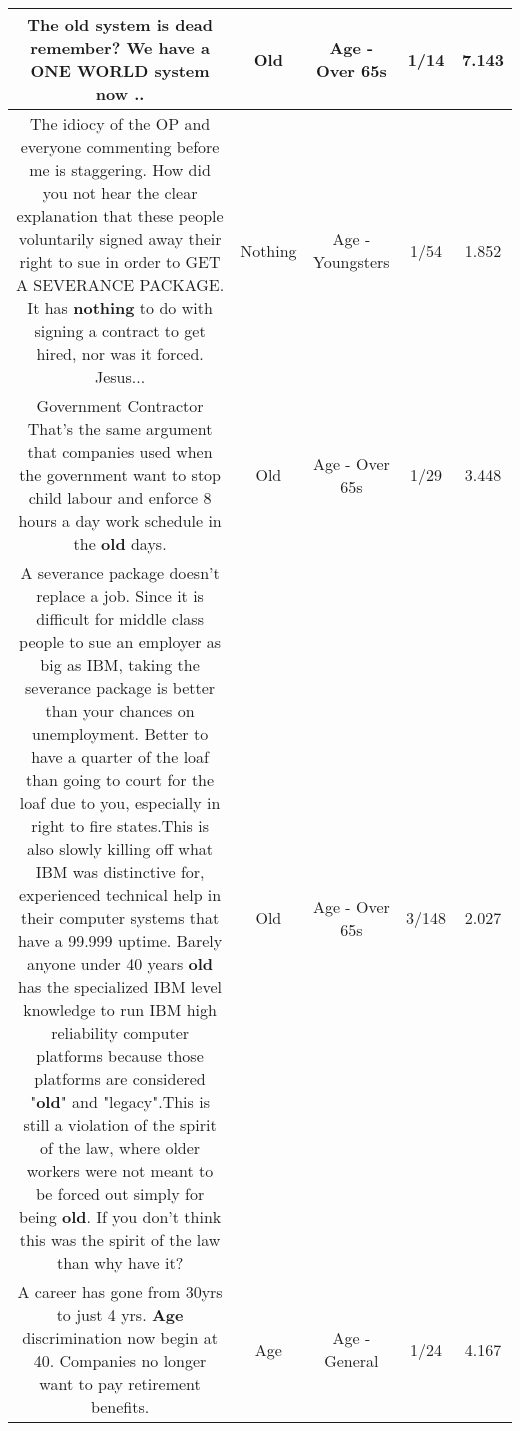 \documentclass[11pt]{article}
\newlength\mylength
\begin{document}
\begin{center}
\begin{longtable}{|C{.65\mylength}|C{.30\mylength}|C{.12\mylength}|C{.12\mylength}|C{.12\mylength}|}
  \small The \textbf{old} system is dead remember? We have a ONE WORLD system now ..\normalsize   & Old & Age - Over 65s & 1/14 & 7.143 \\  \hline
  \small The idiocy of the OP and everyone commenting before me is staggering. How did you not hear the clear explanation that these people voluntarily signed away their right to sue in order to GET A SEVERANCE PACKAGE. It has \textbf{nothing} to do with signing a contract to get hired, nor was it forced. Jesus...\normalsize   & Nothing & Age - Youngsters & 1/54 & 1.852 \\  \hline
  \small Government Contractor That's the same argument that companies used when the government want to stop child labour and enforce 8 hours a day work schedule in the \textbf{old} days.\normalsize   & Old & Age - Over 65s & 1/29 & 3.448 \\  \hline
  \small A severance package doesn't replace a job.  Since it is difficult for middle class people to sue an employer as big as IBM, taking the severance package is better than your chances on unemployment.  Better to have a quarter of the loaf than going to court for the loaf due to you, especially in right to fire states.This is also slowly killing off what IBM was distinctive for, experienced technical help in their computer systems that have a 99.999 uptime.  Barely anyone under 40 years \textbf{old} has the specialized IBM level knowledge to run IBM high reliability computer platforms because those platforms are considered "\textbf{old}" and "legacy".This is still a violation of the spirit of the law, where older workers were not meant to be forced out simply for being \textbf{old}.  If you don't think this was the spirit of the law than why have it?\normalsize   & Old & Age - Over 65s & 3/148 & 2.027 \\  \hline
  \small A career has gone from 30yrs to just 4 yrs.  \textbf{Age} discrimination now begin at 40. Companies no longer want to pay retirement benefits.\normalsize   & Age & Age - General & 1/24 & 4.167 \\  \hline

\end{longtable}
\end{center}
\end{document}
